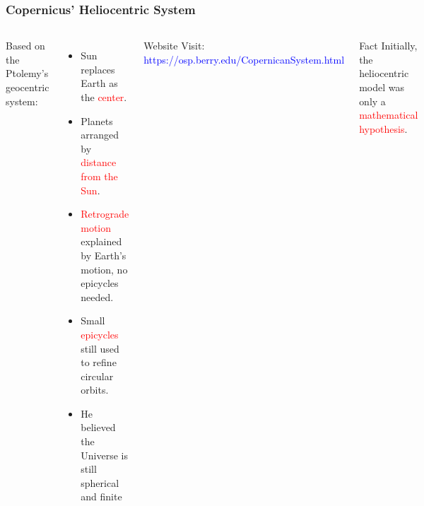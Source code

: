 \documentclass[aspectratio=1611, 9pt]{beamer}
\begin{document}
\begin{frame}
  \frametitle{Copernicus' Heliocentric System}
  \begin{columns}
    Based on the Ptolemy's geocentric system:
    \begin{itemize}
      \item Sun replaces Earth as the \textcolor{red}{center}.
      \item Planets arranged by \textcolor{red}{distance from the Sun}.
      \item \textcolor{red}{Retrograde motion} explained by Earth's motion, no epicycles needed.
      \item Small \textcolor{red}{epicycles} still used to refine circular orbits.
      \item He believed the Universe is still spherical and finite
    \end{itemize}

    \begin{alertblock}{Website}
      Visit: \textcolor{blue}{https://osp.berry.edu/CopernicanSystem.html}
    \end{alertblock}
    \begin{block}{Fact}
      Initially, the heliocentric model was only a \textcolor{red}{mathematical hypothesis}.
    \end{block}
  \end{columns}
\end{frame}
\end{document}
